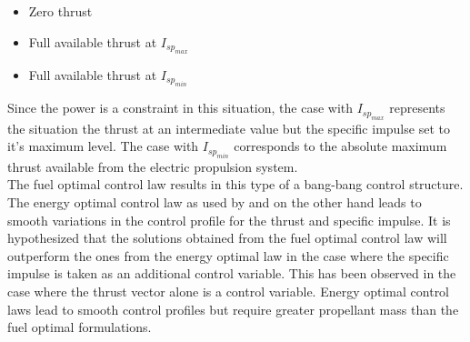 \begin{itemize}
	\item Zero thrust
	\item Full available thrust at $I_{sp_{max}}$
	\item Full available thrust at $I_{sp_{min}}$
\end{itemize}
Since the power is a constraint in this situation, the case with $I_{sp_{max}}$ represents the situation the thrust at an intermediate value but the specific impulse set to it's maximum level. The case with $I_{sp_{min}}$ corresponds to the absolute maximum thrust available from the electric propulsion system.\\
The fuel optimal control law results in this type of a bang-bang control structure. The energy optimal control law as used by \cite{genta_optimal_2016} and \cite{nah_fuel-optimal_2001} on the other hand leads to smooth variations in the control profile for the thrust and specific impulse. It is hypothesized that the solutions obtained from the fuel optimal control law will outperform the ones from the energy optimal law in the case where the specific impulse is taken as an additional control variable. This has been observed in the case where the thrust vector alone is a control variable. Energy optimal control laws lead to smooth control profiles but require greater propellant mass than the fuel optimal formulations.